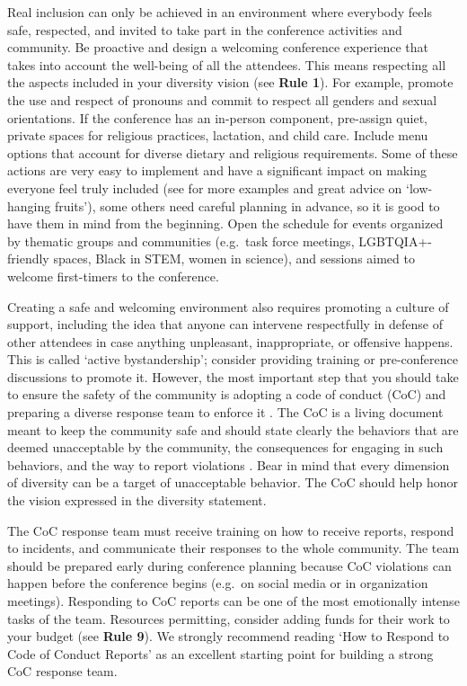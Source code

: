 \documentclass[10pt,letterpaper]{article}
\begin{document}
Real inclusion can only be achieved in an environment where everybody feels safe, respected, and invited to take part in the conference activities and community. Be proactive and design a welcoming conference experience that takes into account the well-being of all the attendees. This means respecting all the aspects included in your diversity vision (see \textbf{Rule 1}). For example, promote the use and respect of pronouns and commit to respect all genders and sexual orientations. If the conference has an in-person component, pre-assign quiet, private spaces for religious practices, lactation, and child care. Include menu options that account for diverse dietary and religious requirements.
Some of these actions are very easy to implement and have a significant impact on making everyone feel truly included (see \cite{numfocus_discover_2021} for more examples and great advice on `low-hanging fruits'), some others need careful planning in advance, so it is good to have them in mind from the beginning.
Open the schedule for events organized by thematic groups and communities (e.g.\ task force meetings, LGBTQIA+-friendly spaces, Black in STEM, women in science), and sessions aimed to welcome first-timers to the conference.

Creating a safe and welcoming environment also requires promoting a culture of support, including the idea that anyone can intervene respectfully in defense of other attendees in case anything unpleasant, inappropriate, or offensive happens.
This is called `active bystandership'; consider providing training or pre-conference discussions to promote it.
However, the most important step that you should take to ensure the safety of the community is
adopting a code of conduct (CoC) and preparing a diverse response team to enforce it \cite{favaroYourScienceConference2016}.
The CoC is a living document meant to keep the community safe and should state clearly the behaviors that are deemed unacceptable by the community, the consequences for engaging in such behaviors, and the way to report violations \cite{auroraHowRespondCode2019}. 
Bear in mind that every dimension of diversity can be a target of unacceptable behavior. The CoC should help honor the vision expressed in the diversity statement.
 

The CoC response team must receive training on how to receive reports, respond to incidents, and communicate their responses to the whole community. The team should be prepared early during conference planning because CoC violations can happen before the conference begins (e.g.\ on social media or in organization meetings).  
Responding to CoC reports can be one of the most emotionally intense tasks of the team. Resources permitting, consider adding funds for their work to your budget (see \textbf{Rule 9}).
We strongly recommend reading `How to Respond to Code of Conduct Reports' \cite{auroraHowRespondCode2019} as an excellent starting point for building a strong CoC response team. 
 
\end{document}
